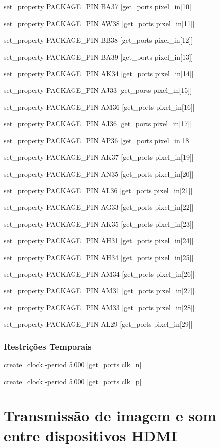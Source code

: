 set\_property PACKAGE\_PIN BA37 [get\_ports {pixel\_in[10]}]

set\_property PACKAGE\_PIN AW38 [get\_ports {pixel\_in[11]}]

set\_property PACKAGE\_PIN BB38 [get\_ports {pixel\_in[12]}]

set\_property PACKAGE\_PIN BA39 [get\_ports {pixel\_in[13]}]

set\_property PACKAGE\_PIN AK34 [get\_ports {pixel\_in[14]}]

set\_property PACKAGE\_PIN AJ33 [get\_ports {pixel\_in[15]}]

set\_property PACKAGE\_PIN AM36 [get\_ports {pixel\_in[16]}]

set\_property PACKAGE\_PIN AJ36 [get\_ports {pixel\_in[17]}]

set\_property PACKAGE\_PIN AP36 [get\_ports {pixel\_in[18]}]

set\_property PACKAGE\_PIN AK37 [get\_ports {pixel\_in[19]}]

set\_property PACKAGE\_PIN AN35 [get\_ports {pixel\_in[20]}]

set\_property PACKAGE\_PIN AL36 [get\_ports {pixel\_in[21]}]

set\_property PACKAGE\_PIN AG33 [get\_ports {pixel\_in[22]}]

set\_property PACKAGE\_PIN AK35 [get\_ports {pixel\_in[23]}]

set\_property PACKAGE\_PIN AH31 [get\_ports {pixel\_in[24]}]

set\_property PACKAGE\_PIN AH34 [get\_ports {pixel\_in[25]}]

set\_property PACKAGE\_PIN AM34 [get\_ports {pixel\_in[26]}]

set\_property PACKAGE\_PIN AM31 [get\_ports {pixel\_in[27]}]

set\_property PACKAGE\_PIN AM33 [get\_ports {pixel\_in[28]}]

set\_property PACKAGE\_PIN AL29 [get\_ports {pixel\_in[29]}]

\subsubsection{Restrições Temporais} \label{ap2:planB_timing_cnstrs}

create\_clock -period 5.000 [get\_ports clk\_n]

create\_clock -period 5.000 [get\_ports clk\_p]


\section{Transmissão de imagem e som entre dispositivos HDMI} \label{ap2:imagem_som_RX_TX}

